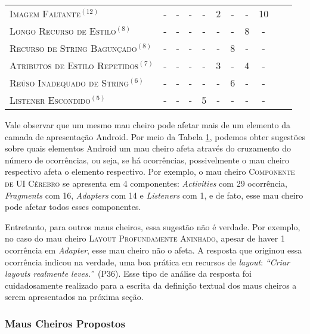 \begin{table}[!htb]
\begin{tabular}{@{}p{7cm}@{}cccccccccp{3cm}}
\textsc{Imagem Faltante}$^{(12)}$                & -   & -   & -   & -   & 2    & -   & -   & 10 &  \\ 
\textsc{Longo Recurso de Estilo}$^{(8)}$         & -   & -   & -   & -   & -    & -   & 8   & -  &  \\ 
\textsc{Recurso de String Bagunçado}$^{(8)}$     & -   & -   & -   & -   & -    & 8   & -   & -  &  \\ 
\textsc{Atributos de Estilo Repetidos}$^{(7)}$   & -   & -   & -   & -   & 3    & -   & 4   & -  &  \\ 
\textsc{Reúso Inadequado de String}$^{(6)}$      & -   & -   & -   & -   & -    & 6   & -   & -  &  \\ 
\textsc{Listener Escondido}$^{(5)}$              & -   & -   & -   & 5   & -    & -   & -   & -  &  \\ 
\bottomrule
\end{tabular}
\label{tab:CategoriesVSFrequency}
\end{table}

Vale observar que um mesmo mau cheiro pode afetar mais de um elemento da camada de apresentação Android. Por meio da Tabela \ref{tab:CategoriesVSFrequency}, podemos obter sugestões sobre quais elementos Android um mau cheiro afeta através do cruzamento do número de ocorrências, ou seja, se há ocorrências, possivelmente o mau cheiro respectivo afeta o elemento respectivo. Por exemplo, o mau cheiro \textsc{\small Componente de UI Cérebro} se apresenta em 4 componentes: \textit{Activities} com 29 ocorrência, \textit{Fragments} com 16, \textit{Adapters} com 14 e \textit{Listeners} com 1, e de fato, esse mau cheiro pode afetar todos esses componentes. 

Entretanto, para outros maus cheiros, essa sugestão não é verdade. Por exemplo, no caso do mau cheiro \textsc{\small Layout Profundamente Aninhado}, apesar de haver 1 ocorrência em \textit{Adapter}, esse mau cheiro não o afeta. A resposta que originou essa ocorrência indicou na verdade, uma boa prática em recursos de \textit{layout}: \textit{``Criar layouts realmente leves.''}~(P36). Esse tipo de análise da resposta foi cuidadosamente realizado para a escrita da definição textual dos maus cheiros a serem apresentados na próxima seção.


\subsubsection{Maus Cheiros Propostos}
\label{phase1-code-smells-derivation}


